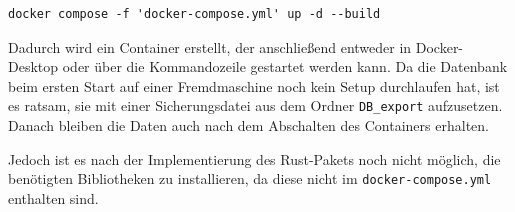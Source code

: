 \begin{verbatim}
docker compose -f 'docker-compose.yml' up -d --build
\end{verbatim}  

Dadurch wird ein Container erstellt, der anschließend entweder in Docker-Desktop oder über die Kommandozeile gestartet werden kann.  
Da die Datenbank beim ersten Start auf einer Fremdmaschine noch kein Setup durchlaufen hat, ist es ratsam, sie mit einer Sicherungsdatei aus dem Ordner \texttt{DB\_export} aufzusetzen.  
Danach bleiben die Daten auch nach dem Abschalten des Containers erhalten.  

Jedoch ist es nach der Implementierung des Rust-Pakets noch nicht möglich, die benötigten Bibliotheken zu installieren, da diese nicht im \texttt{docker-compose.yml} enthalten sind. 




